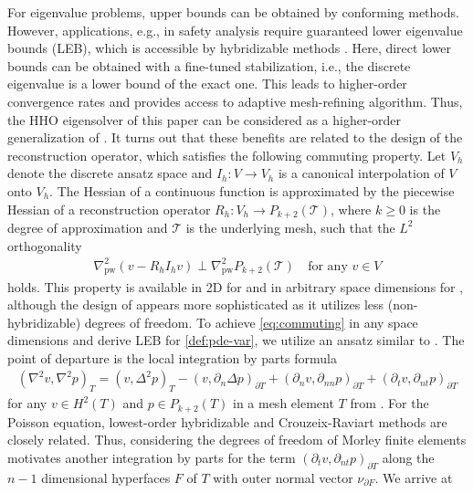 \documentclass[a4paper]{amsart}
\numberwithin{equation}{section}
\def\pw{\mathrm{pw}}
\theoremstyle{definition}
\theoremstyle{remark}
\numberwithin{theorem}{section}
\numberwithin{equation}{section}
\numberwithin{table}{section}
\numberwithin{figure}{section}
\begin{document}
For eigenvalue problems, upper bounds can be obtained by conforming methods. However, applications, e.g., in safety analysis require guaranteed lower eigenvalue bounds (LEB), which is accessible by hybridizable methods \cite{CarstensenZhaiZhang2020,CarstensenGraessleTran2024,Tran2024x2}. Here, direct lower bounds can be obtained with a fine-tuned stabilization, i.e., the discrete eigenvalue is a lower bound of the exact one. This leads to
higher-order convergence rates and provides access to adaptive mesh-refining algorithm. Thus, the HHO eigensolver of this paper can be considered as a higher-order generalization of \cite{CarstensenPuttkammer2023}.
It turns out that these benefits are related to the design of the reconstruction operator, which satisfies the following commuting property.
Let $V_h$ denote the discrete ansatz space and $I_h : V \to V_h$ is a canonical interpolation of $V$ onto $V_h$.
The Hessian of a continuous function is approximated by the piecewise Hessian of a reconstruction operator $R_h : V_h \to P_{k+2}(\mathcal{T})$, where $k \geq 0$ is the degree of approximation and $\mathcal{T}$ is the underlying mesh, such that the $L^2$ orthogonality
\begin{align}\label{eq:commuting}
    \nabla^2_\pw (v - R_h I_h v) \perp \nabla^2_\pw P_{k+2}(\mathcal{T}) \quad\text{for any } v \in V
\end{align}
holds.
This property is available in 2D for \cite{DongErn2022} and in arbitrary space dimensions for \cite{BonaldiDiPietroGeymonat2018}, although the design of \cite{DongErn2022} appears more sophisticated as it utilizes less (non-hybridizable) degrees of freedom. To achieve \eqref{eq:commuting} in any space dimensions and derive LEB for \eqref{def:pde-var}, we utilize an ansatz similar to \cite{LiWangWangZhang2024}. The point of departure is the local integration by parts formula
\begin{align}\label{eq:iby-de}
    (\nabla^2 v, \nabla^2 p)_{T} = (v, \Delta^2 p)_{T} - (v, \partial_n \Delta p)_{\partial T} + (\partial_n v, \partial_{nn} p)_{\partial T} + (\partial_t v, \partial_{nt} p)_{\partial T}
\end{align}
for any $v \in H^2(T)$ and $p \in P_{k+2}(T)$ in a mesh element $T$
from \cite{DongErn2022}.
For the Poisson equation, lowest-order hybridizable and Crouzeix-Raviart methods are closely related.
Thus, considering the degrees of freedom of Morley finite elements motivates another integration by parts for the term $(\partial_t v, \partial_{nt} p)_{\partial T}$ along the $n-1$ dimensional hyperfaces $F$ of $T$ with outer normal vector $\nu_{\partial F}$. We arrive at
\end{document}
